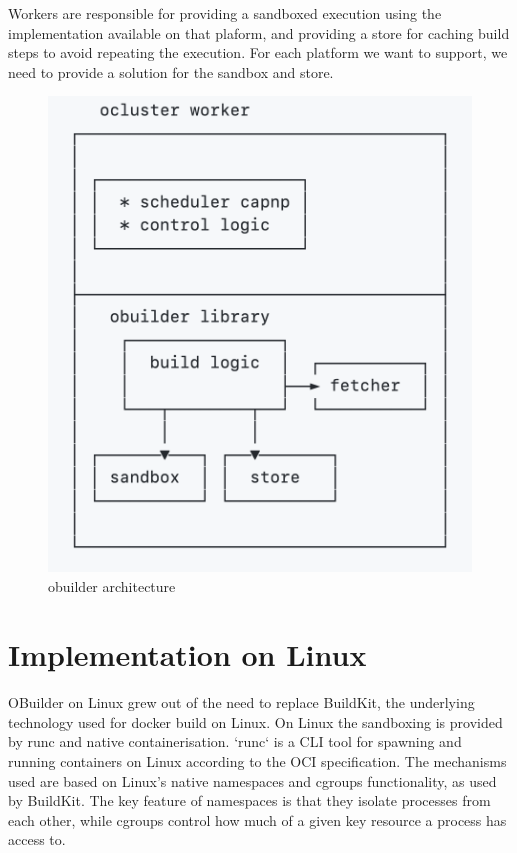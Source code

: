 \documentclass[manuscript,screen,sigplan]{acmart}
\begin{document}
Workers are responsible for providing a sandboxed execution using the implementation available on that plaform, and providing a store for caching build steps to avoid repeating the execution. For each platform we want to support, we need to provide a solution for the sandbox and store.

\begin{figure}
  \includegraphics[width=\linewidth]{obuilder-arch.png}
  \caption{obuilder architecture}
  \label{fig:arch1}
\end{figure}

\section{Implementation on Linux}

OBuilder on Linux grew out of the need to replace BuildKit, the underlying technology used for docker build on Linux. On Linux the sandboxing is provided by runc and native containerisation. `runc` is a CLI tool for spawning and running containers on Linux according to the OCI specification. The mechanisms used are based on Linux's native namespaces and cgroups functionality, as used by BuildKit. The key feature of namespaces is that they isolate processes from each other, while cgroups control how much of a given key resource a process has access to. 
\end{document}
